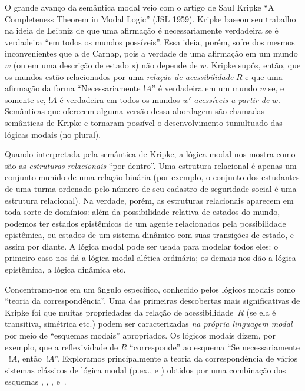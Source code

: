 \documentclass[../../../include/open-logic-section]{subfiles}
\begin{document}
O grande avanço da semântica modal veio com o artigo de Saul Kripke
``A Completeness Theorem in Modal Logic'' (JSL 1959). Kripke baseou
seu trabalho na ideia de Leibniz de que uma afirmação é necessariamente
verdadeira se é verdadeira ``em todos os mundos possíveis''. Essa ideia,
porém, sofre dos mesmos inconvenientes que a de Carnap, pois a verdade de
uma afirmação em um mundo $w$ (ou em uma descrição de estado $s$) não
depende de $w$. Kripke supôs, então, que os mundos estão relacionados por
uma \emph{relação de acessibilidade} $R$ e que uma afirmação da forma
``Necessariamente $!A$'' é verdadeira em um mundo $w$ se, e somente se,
$!A$ é verdadeira em todos os mundos $w'$ \emph{acessíveis a partir de}
$w$. Semânticas que oferecem alguma versão dessa abordagem são chamadas
semânticas de Kripke e tornaram possível o desenvolvimento tumultuado das
lógicas modais (no plural).

Quando interpretada pela semântica de Kripke, a lógica modal nos mostra
como são as \emph{estruturas relacionais} ``por dentro''. Uma estrutura
relacional é apenas um conjunto munido de uma relação binária (por
exemplo, o conjunto dos estudantes de uma turma ordenado pelo número de
seu cadastro de seguridade social é uma estrutura relacional). Na verdade,
porém, as estruturas relacionais aparecem em toda sorte de domínios: além
da possibilidade relativa de estados do mundo, podemos ter estados
epistêmicos de um agente relacionados pela possibilidade epistêmica, ou
estados de um sistema dinâmico com suas transições de estado, e assim por
diante. A lógica modal pode ser usada para modelar todos eles: o primeiro
caso nos dá a lógica modal alética ordinária; os demais nos dão a lógica
epistêmica, a lógica dinâmica etc.

Concentramo-nos em um ângulo específico, conhecido pelos lógicos modais
como ``teoria da correspondência''. Uma das primeiras descobertas mais
significativas de Kripke foi que muitas propriedades da relação de
acessibilidade~$R$ (se ela é transitiva, simétrica etc.) podem ser
caracterizadas \emph{na própria linguagem modal} por meio de ``esquemas
modais'' apropriados. Os lógicos modais dizem, por exemplo, que a
reflexividade de $R$ ``corresponde'' ao esquema ``Se necessariamente
~$!A$, então~$!A$''. Exploramos principalmente a teoria da correspondência
de vários sistemas clássicos de lógica modal (p.ex.,  e
) obtidos por uma combinação dos esquemas , , ,
 e~.
\end{document}
